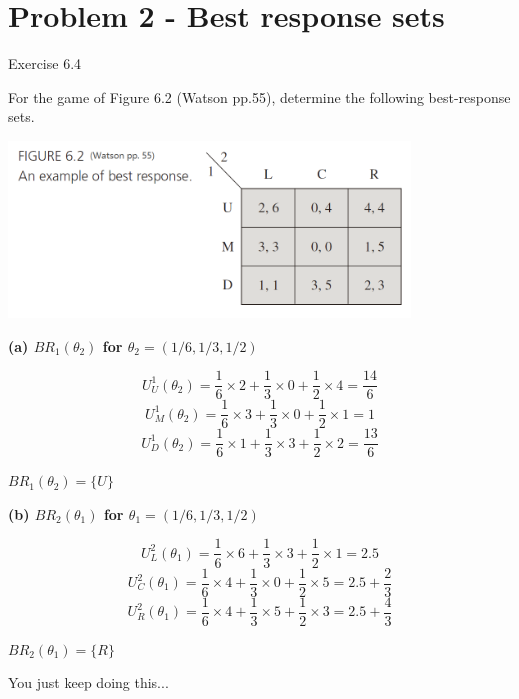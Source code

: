 \documentclass{article}
\begin{document}
\bigskip

\newpage

\section{Problem 2 - Best response sets} 

Exercise 6.4 

For the game of Figure 6.2 (Watson pp.55), determine the following best-response sets.


{\includegraphics[width=0.8\textwidth]{7.f6_2}
\label{fig:f6_2}}
\vspace{2mm}


\begin{mdframed}[backgroundcolor=blue!20,linecolor=white]

\textbf{(a) $BR_1(\theta_2)$ for $\theta_2 = (1/6,1/3,1/2)$}

$$U^1_U(\theta_2) = \frac{1}{6} \times 2 + \frac{1}{3} \times 0 + \frac{1}{2}\times 4=\frac{14}{6}$$
$$U^1_M(\theta_2) = \frac{1}{6} \times 3 + \frac{1}{3} \times 0 + \frac{1}{2}\times 1=1$$
$$U^1_D(\theta_2) = \frac{1}{6} \times 1 + \frac{1}{3} \times 3 + \frac{1}{2}\times 2=\frac{13}{6}$$

$BR_1(\theta_2)=\{U\}$

\medskip

\textbf{(b) $BR_2(\theta_1)$ for $\theta_1 = (1/6,1/3,1/2)$}

$$U^2_L(\theta_1) = \frac{1}{6} \times 6 + \frac{1}{3} \times 3 + \frac{1}{2}\times 1=2.5$$
$$U^2_C(\theta_1) = \frac{1}{6} \times 4 + \frac{1}{3} \times 0 + \frac{1}{2}\times 5=2.5 + \frac{2}{3}$$
$$U^2_R(\theta_1) = \frac{1}{6} \times 4 + \frac{1}{3} \times 5 + \frac{1}{2}\times 3=2.5 + \frac{4}{3}$$

$BR_2(\theta_1)=\{R\}$

You just keep doing this...
\end{mdframed}
\end{document}
